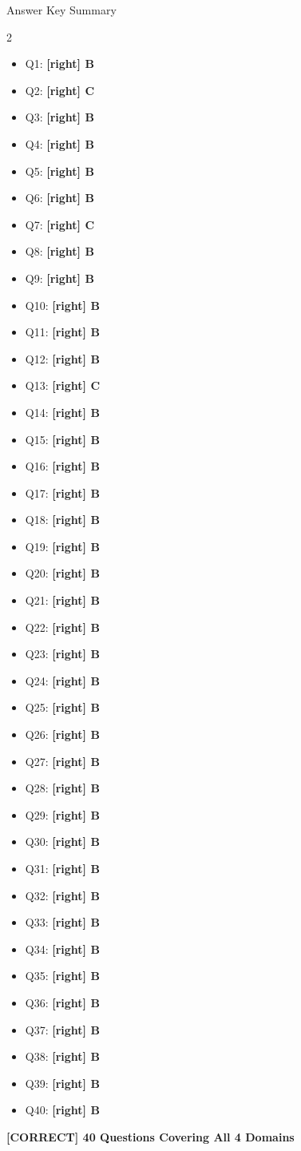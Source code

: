 \documentclass[11pt,a4paper]{beamer}
\newcommand{\greennote}[1]{\textcolor{green!50!black}{\textbf{[CORRECT] #1}}}
\newcommand{\correct}[1]{\textcolor{green!50!black}{\textbf{[right] #1}}}
\begin{document}
\begin{frame}{Answer Key Summary}
\begin{multicols}{2}
\small
\begin{itemize}
    \item Q1: \correct{B}
    \item Q2: \correct{C}
    \item Q3: \correct{B}
    \item Q4: \correct{B}
    \item Q5: \correct{B}
    \item Q6: \correct{B}
    \item Q7: \correct{C}
    \item Q8: \correct{B}
    \item Q9: \correct{B}
    \item Q10: \correct{B}
    \item Q11: \correct{B}
    \item Q12: \correct{B}
    \item Q13: \correct{C}
    \item Q14: \correct{B}
    \item Q15: \correct{B}
    \item Q16: \correct{B}
    \item Q17: \correct{B}
    \item Q18: \correct{B}
    \item Q19: \correct{B}
    \item Q20: \correct{B}
    \item Q21: \correct{B}
    \item Q22: \correct{B}
    \item Q23: \correct{B}
    \item Q24: \correct{B}
    \item Q25: \correct{B}
    \item Q26: \correct{B}
    \item Q27: \correct{B}
    \item Q28: \correct{B}
    \item Q29: \correct{B}
    \item Q30: \correct{B}
    \item Q31: \correct{B}
    \item Q32: \correct{B}
    \item Q33: \correct{B}
    \item Q34: \correct{B}
    \item Q35: \correct{B}
    \item Q36: \correct{B}
    \item Q37: \correct{B}
    \item Q38: \correct{B}
    \item Q39: \correct{B}
    \item Q40: \correct{B}
\end{itemize}
\end{multicols}
\vspace{0.3cm}
\centering
\greennote{40 Questions Covering All 4 Domains}
\end{frame}
\end{document}
